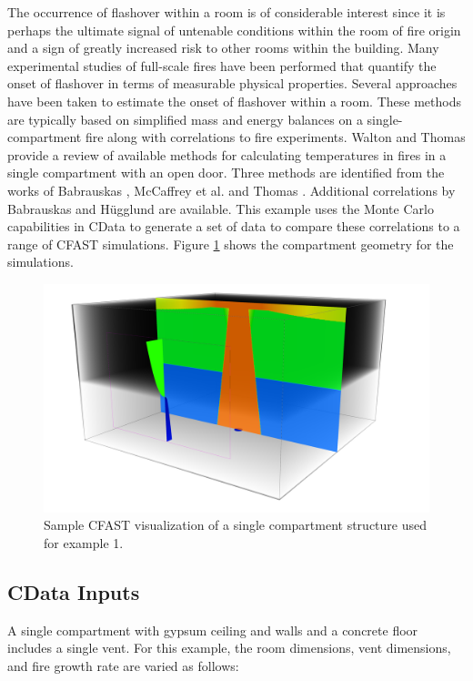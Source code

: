 \documentclass[12pt,twoside]{book}
\begin{document}
The occurrence of flashover within a room is of considerable interest since it is perhaps the ultimate signal of untenable conditions within the room of fire origin and a sign of greatly increased risk to other rooms within the building. Many experimental studies of full-scale fires have been performed that quantify the onset of flashover in terms of measurable physical properties. Several approaches have been taken to estimate the onset of flashover within a room. These methods are typically based on simplified mass and energy balances on a single-compartment fire along with correlations to fire experiments. Walton and Thomas \cite{Walton:2016} provide a review of available methods for calculating temperatures in fires in a single compartment with an open door. Three methods are identified from the works of Babrauskas \cite{Babrauskas:1980}, McCaffrey et al. \cite{McCaffrey:1981uq} and Thomas \cite{Thomas:1981fk}. Additional correlations by Babrauskas \cite{Babrauskas:1980} and H\"ugglund \cite{Hagglund:1980} are available. This example uses the Monte Carlo capabilities in CData to generate a set of data to compare these correlations to a range of CFAST simulations. Figure \ref{flashover_geometry} shows the compartment geometry for the simulations.

\begin{figure}[h!]
\centering
\includegraphics[width=4.5in]{FIGURES/Flashover.png}
\caption{Sample CFAST visualization of a single compartment structure used for example 1.}
\label{flashover_geometry}
\end{figure}

\subsection{CData Inputs}
A single compartment with gypsum ceiling and walls and a concrete floor includes a single vent. For this example, the room dimensions, vent dimensions, and fire growth rate are varied as follows:
\end{document}
